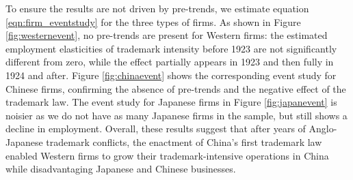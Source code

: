 \documentclass[12pt]{article}
\begin{document}
To ensure the results are not driven by pre-trends, we estimate equation \eqref{eqn:firm_eventstudy} for the three types of firms. As shown in Figure \ref{fig:westernevent}, no pre-trends are present for Western firms: the estimated employment elasticities of trademark intensity before 1923 are not significantly different from zero, while the effect partially appears in 1923 and then fully in 1924 and after. Figure \ref{fig:chinaevent} shows the corresponding event study for Chinese firms, confirming the absence of pre-trends and the negative effect of the trademark law. The event study for Japanese firms in Figure  \ref{fig:japanevent}  is noisier as we do not have as many Japanese firms in the sample, but still shows a decline in employment. Overall, these results suggest that after years of Anglo-Japanese trademark conflicts, the enactment of China's first trademark law enabled Western firms to grow their trademark-intensive operations in China while disadvantaging Japanese and Chinese businesses.

\end{document}
